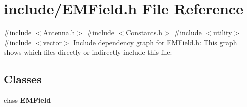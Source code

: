 \section{include/\+E\+M\+Field.h File Reference}
\label{_e_m_field_8h}
{\ttfamily \#include $<$Antenna.\+h$>$}\newline
{\ttfamily \#include $<$Constants.\+h$>$}\newline
{\ttfamily \#include $<$utility$>$}\newline
{\ttfamily \#include $<$vector$>$}\newline
Include dependency graph for E\+M\+Field.\+h\+:
This graph shows which files directly or indirectly include this file\+:
\subsection*{Classes}
\begin{DoxyCompactItemize}
\item 
class \textbf{ E\+M\+Field}
\end{DoxyCompactItemize}

